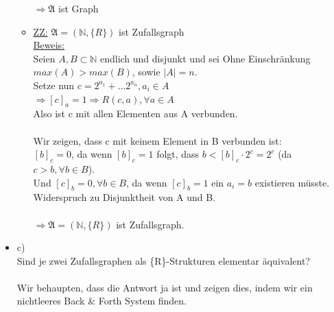 \documentclass[a4paper]{scrartcl}
\begin{document}
\begin{itemize}
\begin{itemize}
                    $\Rightarrow \mathfrak{A}$ ist Graph
                
                \item \underline{ZZ:} $\mathfrak{A} = (\mathds{N}, \{R\})$ ist Zufallsgraph\\
                    \underline{Beweis:}\\
                    Seien $A,B \subset \mathds{N}$ endlich und disjunkt und sei Ohne Einschränkung $max(A) > max(B)$, sowie $|A| = n$.\\
                    Setze nun $c = 2^{a_1} + \dots 2^{a_n}, a_i \in A$\\
                    $\Rightarrow [c]_a = 1 \Rightarrow R(c,a), \forall a \in A$\\
                    Also ist c mit allen Elementen aus A verbunden.\\
                    \\Wir zeigen, dass c mit keinem Element in B verbunden ist:\\
                    $[b]_c = 0$, da wenn $[b]_c = 1$ folgt, dass $b < [b]_c \cdot 2^c = 2^c$ (da $c > b, \forall b \in B$).\\
                    Und $[c]_b = 0, \forall b \in B$, da wenn $[c]_b = 1$ ein $a_i = b$ existieren müsste. Widerspruch zu Disjunktheit von A und B.\\
                    \\$\Rightarrow \mathfrak{A} = (\mathds{N}, \{R\})$ ist Zufallsgraph.

            \end{itemize}
        \item c)\\
            Sind je zwei Zufallsgraphen als \{R\}-Strukturen elementar äquivalent?\\

            \\Wir behaupten, dass die Antwort ja ist und zeigen dies, indem wir ein nichtleeres Back \& Forth System finden.\\

            \begin{comment}
            \\Für die Zufallsgraphen muss auch die für sie typische Eigenschaft gelten, also:\\
            $\forall A,B$ Mengen, die endlich und disjunkt:\\
            $\exists c \notin B$ sodass c mit allen aus A und keinem aus B verbunden ist.\\
            \\\underline{Beweis:}\\
            Wir können ein d konstruieren mit d  
            \end{comment}

    \end{itemize}
\end{document}
